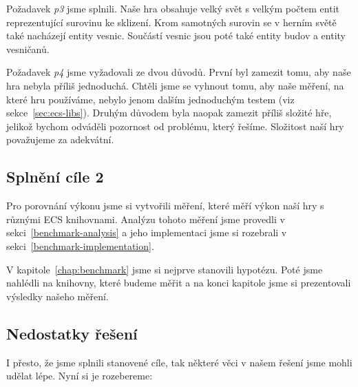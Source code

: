 Požadavek \textit{p3} jsme splnili. Naše hra obsahuje velký svět s velkým počtem entit reprezentující surovinu ke sklizení. Krom samotných surovin se v herním světě také nacházejí entity vesnic. Součástí vesnic jsou poté také entity budov a entity vesničanů.

Požadavek \textit{p4} jsme vyžadovali ze dvou důvodů. První byl zamezit tomu, aby naše hra nebyla příliš jednoduchá. Chtěli jsme se vyhnout tomu, aby naše měření, na které hru používáme, nebylo jenom dalším jednoduchým testem (viz sekce~\ref{sec:ecs-libs}). Druhým důvodem byla naopak zamezit příliš složité hře, jelikož bychom odváděli pozornost od problému, který řešíme. Složitost naší hry považujeme za adekvátní.

\subsection{Splnění cíle 2}
Pro porovnání výkonu jsme si vytvořili měření, které měří výkon naší hry s různými ECS knihovnami. Analýzu tohoto měření jsme provedli v sekci~\ref{benchmark-analysis} a jeho implementaci jsme si rozebrali v sekci~\ref{benchmark-implementation}.

V kapitole~\ref{chap:benchmark} jsme si nejprve stanovili hypotézu. Poté jsme nahlédli na knihovny, které budeme měřit a na konci kapitole jsme si prezentovali výsledky našeho měření.

\subsection{Nedostatky řešení}
I přesto, že jsme splnili stanovené cíle, tak některé věci v našem řešení jsme mohli udělat lépe. Nyní si je rozebereme:

